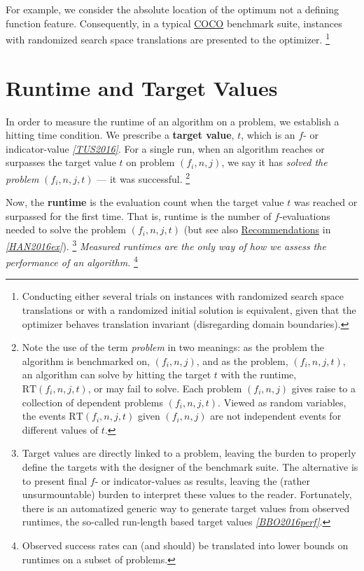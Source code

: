 \documentclass[letterpaper,12pt,english]{article}
\begin{document}
For example, we consider the absolute location of the optimum not a defining
function feature. Consequently, in a typical \href{https://github.com/numbbo/coco}{COCO} benchmark suite, instances
with randomized search space translations are presented to the optimizer. \footnote[8]{
Conducting either several trials on instances with randomized search space
translations or with a randomized initial solution is equivalent, given
that the optimizer behaves translation invariant (disregarding domain
boundaries).
}


\section{Runtime and Target Values}
\label{index:runtime-and-target-values}
In order to measure the runtime of an algorithm on a problem, we
establish a hitting time condition.
We prescribe a \textbf{target value}, \(t\), which is an \(f\)- or
indicator-value \label{index:id28}{\hyperref[index:tus2016]{\emph{{[}TUS2016{]}}}}.
For a single run, when an algorithm reaches or surpasses the target value \(t\)
on problem \((f_i, n, j)\), we say it has \emph{solved the problem} \((f_i, n, j, t)\) --- it was successful. \footnote[9]{
Note the use of the term \emph{problem} in two meanings: as the problem the
algorithm is benchmarked on, \((f_i, n, j)\), and as the problem, \((f_i, n, j, t)\), an algorithm can
solve by hitting the target \(t\) with the runtime, \(\mathrm{RT}(f_i, n, j, t)\), or may fail to solve.
Each problem \((f_i, n, j)\) gives raise to a collection of dependent problems \((f_i, n, j, t)\).
Viewed as random variables, the events \(\mathrm{RT}(f_i, n, j, t)\) given \((f_i, n, j)\) are not
independent events for different values of \(t\).
}

Now, the \textbf{runtime} is the evaluation count when the target value \(t\) was
reached or surpassed for the first time.
That is, runtime is the number of \(f\)-evaluations needed to solve the problem
\((f_i, n, j, t)\) (but see also \href{https://www.github.com}{Recommendations} in \label{index:id30}{\hyperref[index:han2016ex]{\emph{{[}HAN2016ex{]}}}}). \footnote[10]{
Target values are directly linked to a problem, leaving the burden to
properly define the targets with the designer of the benchmark suite.
The alternative is to present final \(f\)- or indicator-values as results,
leaving the (rather unsurmountable) burden to interpret these values to the
reader.
Fortunately, there is an automatized generic way to generate target values
from observed runtimes, the so-called run-length based target values
\label{index:id35}{\hyperref[index:bbo2016perf]{\emph{{[}BBO2016perf{]}}}}.
}
\emph{Measured runtimes are the only way of how we assess the performance of an
algorithm.} \footnote[11]{
Observed success rates can (and should) be translated into lower bounds
on runtimes on a subset of problems.
}
\end{document}
